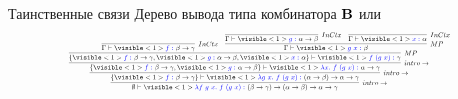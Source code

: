     \begin{frame}[noframenumbering]{Таинственные связи \popslide}
        Дерево вывода типа комбинатора $\mathbf{B}$ или 
        \[\resizebox{0.8\hsize}{!}{
            \infer[intro\to]{\emptyset \vdash \visible<1>{{\color{blue} \lambda f~g~x.~f~(g~x) :~}} (\beta \to \gamma) \to ({ \alpha} \to \beta) \to \alpha \to \gamma}{
                \infer[intro\to]{\{\visible<1>{{\color{blue}f:~}} \beta \to \gamma\} \vdash \visible<1>{{\color{blue} \lambda g~x.~f~(g~x) :~}} ({ \alpha} \to \beta) \to \alpha \to \gamma}{
                    \infer[intro\to]{\{\visible<1>{{\color{blue}f:~}} \beta \to \gamma, \visible<1>{{\color{blue}g:~}} {\alpha} \to \beta\} \vdash \visible<1>{{\color{blue} \lambda x.~f~(g~x) :~}} \alpha \to \gamma }{
                        \infer[MP]{\{\visible<1>{{\color{blue}f:~}} \beta \to \gamma, \visible<1>{{\color{blue}g:~}} {\alpha} \to \beta, \visible<1>{{\color{blue}x:~}}  \alpha\} \vdash \visible<1>{{\color{blue} f~(g~x) :~}} \gamma }{
                            \infer[InCtx]{\Gamma \vdash \visible<1>{{\color{blue} f :~}} \beta \to \gamma}{} &
                            \infer[MP]{\Gamma \vdash \visible<1>{{\color{blue} g~x :~}} \beta}{
                                \infer[InCtx]{\Gamma \vdash \visible<1>{{\color{blue} g :~}} {\alpha} \to \beta}{} &
                                \infer[InCtx]{\color{black} \Gamma \vdash \visible<1>{{\color{blue} x :~}} { \alpha}}{}
                            }}}}
            }
        }\]
    \end{frame}



    \newcommand{\btypename}{Вывод типа для комбинатора $\term{B}$ }

